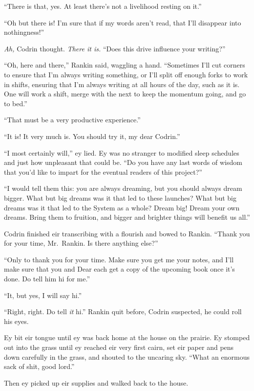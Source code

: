 ``There is that, yes. At least there's not a livelihood resting on it.''

``Oh but there is! I'm sure that if my words aren't read, that I'll disappear into nothingness!''

\emph{Ah,} Codrin thought. \emph{There it is.} ``Does this drive influence your writing?''

``Oh, here and there,'' Rankin said, waggling a hand. ``Sometimes I'll cut corners to ensure that I'm always writing something, or I'll split off enough forks to work in shifts, ensuring that I'm always writing at all hours of the day, such as it is. One will work a shift, merge with the next to keep the momentum going, and go to bed.''

``That must be a very productive experience.''

``It is! It very much is. You should try it, my dear Codrin.''

``I most certainly will,'' ey lied. Ey was no stranger to modified sleep schedules and just how unpleasant that could be. ``Do you have any last words of wisdom that you'd like to impart for the eventual readers of this project?''

``I would tell them this: you are always dreaming, but you should always dream bigger. What but big dreams was it that led to these launches? What but big dreams was it that led to the System as a whole? Dream big! Dream your own dreams. Bring them to fruition, and bigger and brighter things will benefit us all.''

Codrin finished eir transcribing with a flourish and bowed to Rankin. ``Thank you for your time, Mr.~Rankin. Is there anything else?''

``Only to thank you for your time. Make sure you get me your notes, and I'll make sure that you and Dear each get a copy of the upcoming book once it's done. Do tell him hi for me.''

``It, but yes, I will say hi.''

``Right, right. Do tell \emph{it} hi.'' Rankin quit before, Codrin suspected, he could roll his eyes.

Ey bit eir tongue until ey was back home at the house on the prairie. Ey stomped out into the grass until ey reached eir very first cairn, set eir paper and pens down carefully in the grass, and shouted to the uncaring sky. ``What an enormous sack of shit, good lord.''

Then ey picked up eir supplies and walked back to the house.

